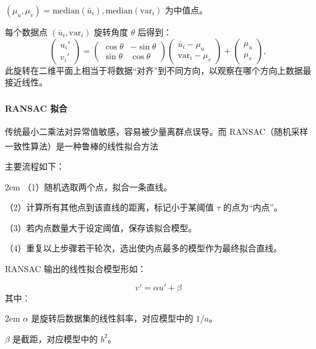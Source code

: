 \documentclass[a4paper]{article}
\newcommand{\supercite}[1]{\textsuperscript{\cite{#1}}}
\begin{document}
\begin{enumerate}
        $(\mu_u, \mu_v) = \text{median}(\bar u_i),\text{median}(\mathrm{var}_i)$ 为中值点。\par
		每个数据点 $(\bar u_i, \mathrm{var}_i)$ 旋转角度 $\theta$ 后得到：
		$$
			\begin{pmatrix}u_i'\\v_i'\end{pmatrix}
			=\begin{pmatrix}
			\cos\theta & -\sin\theta\\
			\sin\theta & \cos\theta
			\end{pmatrix}
			\begin{pmatrix}
			\bar u_i - \mu_u\\
			\mathrm{var}_i - \mu_v
			\end{pmatrix}
			+
			\begin{pmatrix}
			\mu_u\\\mu_v
			\end{pmatrix},
		$$
		\hspace{2em}此旋转在二维平面上相当于将数据“对齐”到不同方向，以观察在哪个方向上数据最接近线性。\par
		\paragraph{RANSAC 拟合\supercite{ref3}}
		传统最小二乘法对异常值敏感，容易被少量离群点误导。而 RANSAC（随机采样一致性算法）是一种鲁棒\supercite{ref4}的线性拟合方法\par
		主要流程如下：\par
		\begin{adjustwidth}{2em}{} %
	     （1）随机选取两个点，拟合一条直线。\par
		 （2）计算所有其他点到该直线的距离，标记小于某阈值 $\tau$ 的点为“内点”。\par
		 （3）若内点数量大于设定阈值，保存该拟合模型。\par
		 （4）重复以上步骤若干轮次，选出使内点最多的模型作为最终拟合直线。
	    \end{adjustwidth}

		RANSAC 输出的线性拟合模型形如：\par 
		$$
		v'=\alpha u' + \beta
		$$
		其中：\par
		\begin{adjustwidth}{2em}{} %
		$\alpha$ 是旋转后数据集的线性斜率，对应模型中的 $1/a$。\par
		$\beta$ 是截距，对应模型中的 $b^2$。\par


\end{adjustwidth}
\end{enumerate}
\end{document}
